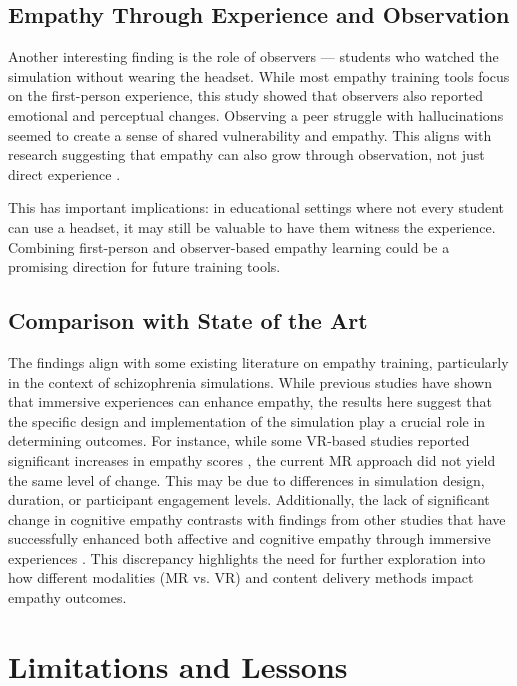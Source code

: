 \subsection{Empathy Through Experience and Observation}

Another interesting finding is the role of observers — students who watched the simulation without wearing the headset. While most empathy training tools focus on the first-person experience, this study showed that observers also reported emotional and perceptual changes. Observing a peer struggle with hallucinations seemed to create a sense of shared vulnerability and empathy. This aligns with research suggesting that empathy can also grow through observation, not just direct experience \cite{Formosa2018}.

This has important implications: in educational settings where not every student can use a headset, it may still be valuable to have them witness the experience. Combining first-person and observer-based empathy learning could be a promising direction for future training tools.


\subsection{Comparison with State of the Art}
The findings align with some existing literature on empathy training, particularly in the context of schizophrenia simulations. While previous studies have shown that immersive experiences can enhance empathy, the results here suggest that the specific design and implementation of the simulation play a crucial role in determining outcomes.
For instance, while some VR-based studies reported significant increases in empathy scores \cite{Martingano2021, Ventura2020}, the current MR approach did not yield the same level of change. This may be due to differences in simulation design, duration, or participant engagement levels.
Additionally, the lack of significant change in cognitive empathy contrasts with findings from other studies that have successfully enhanced both affective and cognitive empathy through immersive experiences \cite{Rueda2020, Ando2011}. This discrepancy highlights the need for further exploration into how different modalities (MR vs. VR) and content delivery methods impact empathy outcomes.


\section{Limitations and Lessons}

